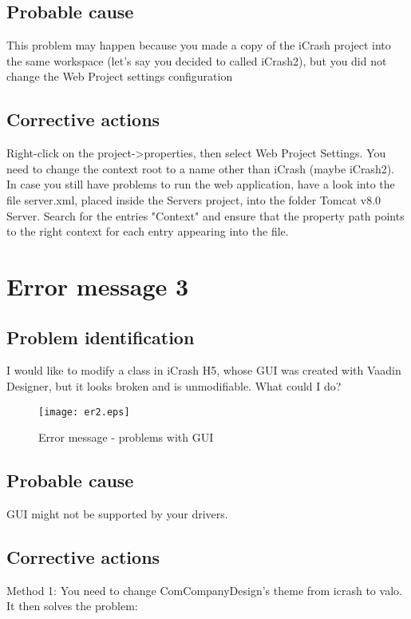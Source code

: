 \subsection{Probable cause}
This problem may happen because you made a copy of the iCrash project into the
same workspace (let's say you decided to called iCrash2), but you did not change
the Web Project settings configuration\\

\subsection{Corrective actions}
Right-click on the project->properties, then select Web Project Settings. You
need to change the context root to a name other than iCrash (maybe iCrash2).\\
In case you still have problems to run the web application, have a look into the file server.xml, placed inside the Servers project, into the folder Tomcat v8.0 Server. Search for the entries "Context" and ensure that the property path points to the right context for each entry appearing into the file.
 

\section{Error message 3}

\subsection{Problem identification}
I would like to modify a class in iCrash H5, whose GUI was created with Vaadin
Designer, but it looks broken and is unmodifiable. What could I do?\\

\begin{figure}
\begin{center}
\texttt{[image: er2.eps]}
\end{center}
\caption{Error message - problems with GUI}
\end{figure}

\subsection{Probable cause}
GUI might not be supported by your drivers.
 
\subsection{Corrective actions}
Method 1: 
You need to change ComCompanyDesign's theme from icrash to valo.
It then solves the problem:


